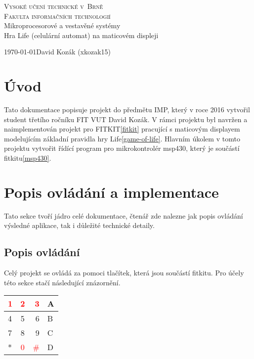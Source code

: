 \documentclass[12pt,a4paper,titlepage]{article}
\begin{document}
\begin{titlepage}
\begin{center}
    {
    	\Huge\textsc{Vysoké učení technické v~Brně}}\\
    \smallskip
    {
    	\huge\textsc{Fakulta informačních technologií}}\\
    \bigskip
    \huge{Mikroprocesorové a vestavěné systémy}\\
    \smallskip
    \Huge{Hra Life (celulární automat) na maticovém displeji}\\
\end{center}
    {\Large \today \hfill David Kozák (xkozak15)  }\\
    \smallskip
\end{titlepage}

\newpage
\tableofcontents
\newpage

\section{Úvod}
Tato dokumentace popisuje projekt do předmětu IMP, který v roce 2016 vytvořil student třetího ročníku FIT VUT David Kozák. V rámci projektu byl navržen a naimplementován projekt pro FITKIT\ref{fitkit} pracující s maticovým displayem modelujícím základní pravidla hry Life\ref{game-of-life}. Hlavním úkolem v tomto projektu vytvořit řídící program pro mikrokontrolér msp430, který je součástí fitkitu\ref{msp430}. 
\section{Popis ovládání a implementace}
Tato sekce tvoří jádro celé dokumentace, čtenář zde nalezne jak popis ovládání výsledné aplikace, tak i důležité technické detaily.
\subsection{Popis ovládání}
Celý projekt se ovládá za pomoci tlačítek, která jsou součástí fitkitu. Pro účely této sekce stačí následující znázornění.

\begin{minipage}{\linewidth}
\bigskip
\begin{center}
  \begin{tabular}{ | l | c | r | l |}
    \hline
    \textcolor{red}{1} & \textcolor{red}{2} & \textcolor{red}{3} & A \\ \hline
    4 & 5 & 6 & B \\ \hline
    7 & 8 & 9 & C \\ \hline
    * & \textcolor{red}{0} & \textcolor{red}{\#} & D \\ 
    \hline
  \end{tabular}
   \label{fitkit:keyboard} 
\end{center}
\bigskip
\end{minipage}
\end{document}
